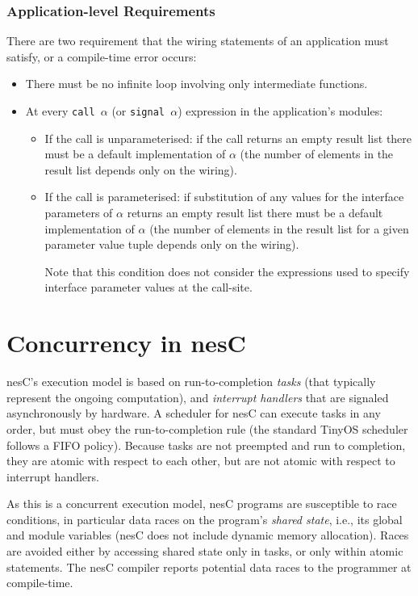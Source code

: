 \documentclass[11pt,letterpaper]{article}
\newcommand{\code}[1]{{\tt #1}}
\newcommand{\nesc}{nesC\xspace}
\newcommand{\tinyos}{TinyOS\xspace}
\begin{document}
\subsubsection{Application-level Requirements}
\label{sec:wiring-reqs}

There are two requirement that the wiring statements of an application must
satisfy, or a compile-time error occurs:
\begin{itemize}
\item There must be no infinite loop involving only intermediate functions.
\item At every \code{call $\alpha$} (or \code{signal $\alpha$}) expression
in the application's modules:
\begin{itemize}
\item If the call is unparameterised: if the call returns an empty result
list there must be a default implementation of $\alpha$ (the number of
elements in the result list depends only on the wiring).
\item If the call is parameterised: if substitution of any values for the
interface parameters of $\alpha$ returns an empty result list there must be
a default implementation of $\alpha$ (the number of elements in the result
list for a given parameter value tuple depends only on the wiring).

Note that this condition does not consider the expressions used to specify
interface parameter values at the call-site.
\end{itemize}
\end{itemize}

\section{Concurrency in \nesc}
\label{sec:concurrency}

\nesc's execution model is based on run-to-completion
\emph{tasks} (that typically represent the ongoing computation), and
\emph{interrupt handlers} that are signaled asynchronously by hardware.  A
scheduler for \nesc can execute tasks in any order, but must obey the
run-to-completion rule (the standard \tinyos scheduler follows a FIFO
policy). Because tasks are not preempted and run to completion, they are
atomic with respect to each other, but are not atomic with respect to
interrupt handlers.

As this is a concurrent execution model, \nesc programs are susceptible to
race conditions, in particular data races on the program's \emph{shared
state}, i.e., its global and module variables (\nesc does not include
dynamic memory allocation). Races are avoided either by accessing
shared state only in tasks, or only within atomic statements. The \nesc
compiler reports potential data races to the programmer at compile-time.
\end{document}

